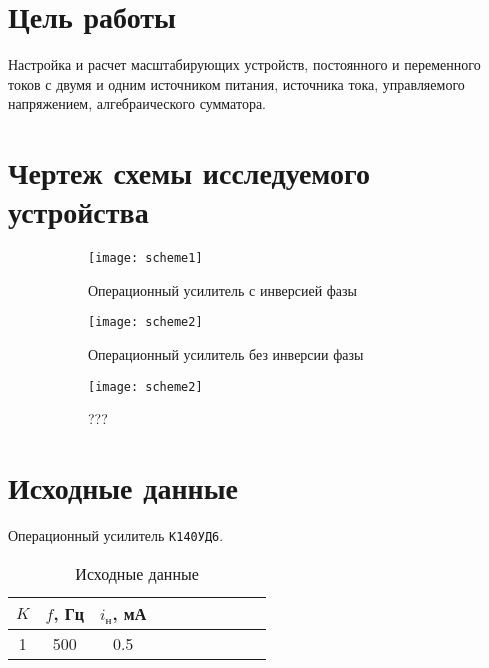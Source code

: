 





\section{Цель работы}

Настройка и расчет масштабирующих устройств, постоянного и переменного токов с двумя и одним источником питания, источника тока, управляемого напряжением, алгебраического сумматора.

\section{Чертеж схемы исследуемого устройства}

\begin{figure}[H]
\begin{center}
	\begin{subfigure}[b]{0.3\textwidth}
		\texttt{[image: scheme1]}
		\caption{Операционный усилитель с инверсией фазы}
	\end{subfigure}
	\begin{subfigure}[b]{0.3\textwidth}
		\texttt{[image: scheme2]}
		\caption{Операционный усилитель без инверсии фазы}
	\end{subfigure}
	\begin{subfigure}[b]{0.3\textwidth}
		\texttt{[image: scheme2]}
		\captionsetup{justification=centering}
		\caption{???}
	\end{subfigure}
	\caption{}
\end{center}
\end{figure}


\section{Исходные данные}

Операционный усилитель \verb+К140УД6+.

\begin{table}[H]
\begin{center}
	\caption{Исходные данные}
	\def\tabcolsep{50pt}
	\begin{tabular}{|c|c|c|c|c|c|c|c|c|c|}
		\hline
		$K$ &
		$f$, Гц &
		$i_\text{н}$, мА \\
		\hline
		1 &
		500 &
		0.5 \\
	    \hline	
	\end{tabular}
	\label{tabular:1}
\end{center}
\end{table}

